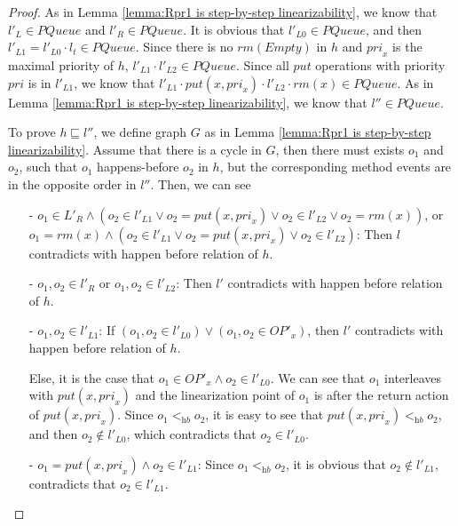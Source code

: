 \begin {proof}
As in Lemma \ref{lemma:Rpr1 is step-by-step linearizability}, we know that $l'_L \in \textit{PQueue}$ and $l'_R \in \textit{PQueue}$. It is obvious that $l'_{\textit{L0}} \in \textit{PQueue}$, and then $l'_{\textit{L1}} = l'_{\textit{L0}} \cdot l_t \in \textit{PQueue}$. Since there is no $\textit{rm}(\textit{Empty})$ in $h$ and $\textit{pri}_x$ is the maximal priority of $h$, $l'_{L1} \cdot l'_{L2} \in \textit{PQueue}$. Since all $\textit{put}$ operations with priority $\textit{pri}$ is in $l'_{L1}$, we know that $l'_{L1} \cdot \textit{put}(x,\textit{pri}_x) \cdot l'_{L2} \cdot \textit{rm}(x) \in \textit{PQueue}$. As in Lemma \ref{lemma:Rpr1 is step-by-step linearizability}, we know that $l'' \in \textit{PQueue}$.

To prove $h \sqsubseteq l''$, we define graph $G$ as in Lemma \ref{lemma:Rpr1 is step-by-step linearizability}. Assume that there is a cycle in $G$, then there must exists $o_1$ and $o_2$, such that $o_1$ happens-before $o_2$ in $h$, but the corresponding method events are in the opposite order in $l''$. Then, we can see

\begin{itemize}
\setlength{\itemsep}{0.5pt}

\item[-] $o_1 \in L'_R \wedge (o_2 \in l'_{L1} \vee o_2 = \textit{put}(x,\textit{pri}_x) \vee o_2 \in l'_{L2} \vee o_2 = \textit{rm}(x))$, or $o_1 = \textit{rm}(x) \wedge (o_2 \in l'_{L1} \vee o_2 = \textit{put}(x,\textit{pri}_x) \vee o_2 \in l'_{L2})$: Then $l$ contradicts with happen before relation of $h$.

\item[-] $o_1, o_2 \in l'_R$ or $o_1, o_2 \in l'_{L2}$: Then $l'$ contradicts with happen before relation of $h$.

\item[-] $o_1, o_2 \in l'_{L1}$: If $(o_1, o_2 \in l'_{L0}) \vee (o_1,o_2 \in \textit{OP}'_x)$, then $l'$ contradicts with happen before relation of $h$.

    Else, it is the case that $o_1 \in \textit{OP}'_x \wedge o_2 \in l'_{L0}$. We can see that $o_1$ interleaves with $\textit{put}(x,\textit{pri}_x)$ and the linearization point of $o_1$ is after the return action of $\textit{put}(x,\textit{pri}_x)$. Since $o_1 <_{\textit{hb}} o_2$, it is easy to see that $\textit{put}(x,\textit{pri}_x) <_{\textit{hb}} o_2$, and then $o_2 \notin l'_{L0}$, which contradicts that $o_2 \in l'_{L0}$.

\item[-] $o_1 = \textit{put}(x,\textit{pri}_x) \wedge o_2 \in l'_{L1}$: Since $o_1 <_{\textit{hb}} o_2$, it is obvious that $o_2 \notin l'_{L1}$, contradicts that $o_2 \in l'_{L1}$.


\end{itemize}
\end{proof}
